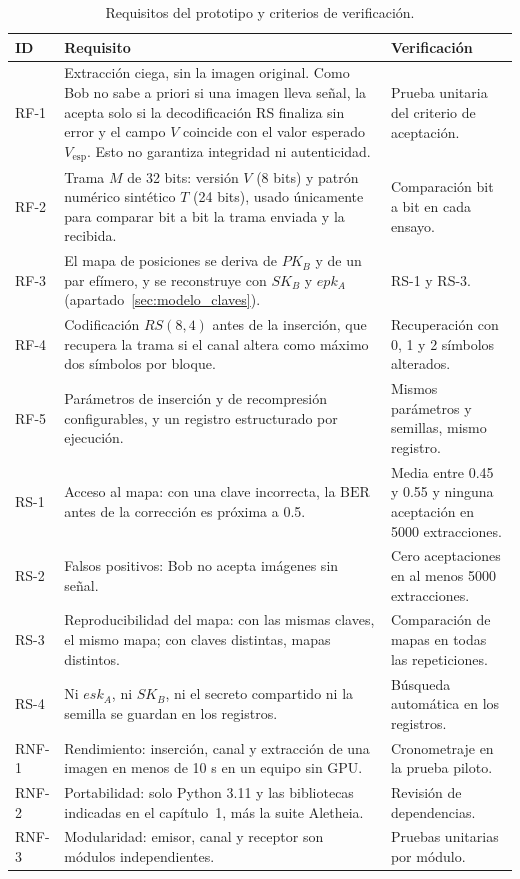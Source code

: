 \documentclass[IB]{TFUOC}%
\begin{document}
\begin{table}[H]
\centering
\scriptsize
\caption{Requisitos del prototipo y criterios de verificación.}
\label{tab:requisitos}
\begin{tabular}{|p{1.1cm}|p{7.2cm}|p{6.2cm}|}
\hline
\rowcolor{uocnavy}
\color{white}\textbf{ID} &
\color{white}\textbf{Requisito} &
\color{white}\textbf{Verificación} \\
\hline
RF-1 & Extracción ciega, sin la imagen original. Como Bob no sabe a priori si una imagen lleva señal, la acepta solo si la decodificación RS finaliza sin error y el campo $V$ coincide con el valor esperado $V_{\mathrm{esp}}$. Esto no garantiza integridad ni autenticidad. & Prueba unitaria del criterio de aceptación. \\
\hline
RF-2 & Trama $M$ de 32 bits: versión $V$ (8 bits) y patrón numérico sintético $T$ (24 bits), usado únicamente para comparar bit a bit la trama enviada y la recibida. & Comparación bit a bit en cada ensayo. \\
\hline
RF-3 & El mapa de posiciones se deriva de $PK_B$ y de un par efímero, y se reconstruye con $SK_B$ y $epk_A$ (apartado~\ref{sec:modelo_claves}). & RS-1 y RS-3. \\
\hline
RF-4 & Codificación $RS(8,4)$ antes de la inserción, que recupera la trama si el canal altera como máximo dos símbolos por bloque. & Recuperación con 0, 1 y 2 símbolos alterados. \\
\hline
RF-5 & Parámetros de inserción y de recompresión configurables, y un registro estructurado por ejecución. & Mismos parámetros y semillas, mismo registro. \\
\hline
RS-1 & Acceso al mapa: con una clave incorrecta, la $\mathrm{BER}$ antes de la corrección es próxima a 0.5. & Media entre 0.45 y 0.55 y ninguna aceptación en 5000 extracciones. \\
\hline
RS-2 & Falsos positivos: Bob no acepta imágenes sin señal. & Cero aceptaciones en al menos 5000 extracciones. \\
\hline
RS-3 & Reproducibilidad del mapa: con las mismas claves, el mismo mapa; con claves distintas, mapas distintos. & Comparación de mapas en todas las repeticiones. \\
\hline
RS-4 & Ni $esk_A$, ni $SK_B$, ni el secreto compartido ni la semilla se guardan en los registros. & Búsqueda automática en los registros. \\
\hline
RNF-1 & Rendimiento: inserción, canal y extracción de una imagen en menos de 10 s en un equipo sin GPU. & Cronometraje en la prueba piloto. \\
\hline
RNF-2 & Portabilidad: solo Python 3.11 y las bibliotecas indicadas en el capítulo~1, más la suite Aletheia. & Revisión de dependencias. \\
\hline
RNF-3 & Modularidad: emisor, canal y receptor son módulos independientes. & Pruebas unitarias por módulo. \\
\hline
\end{tabular}
\end{table}
\end{document}

